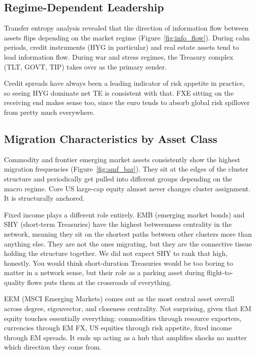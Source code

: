 \documentclass[12pt, letterpaper]{article}
\begin{document}
\subsection{Regime-Dependent Leadership}

Transfer entropy analysis revealed that the direction of information flow between assets flips depending on the market regime (Figure~\ref{fig:info_flow}). During calm periods, credit instruments (HYG in particular) and real estate assets tend to lead information flow. During war and stress regimes, the Treasury complex (TLT, GOVT, TIP) takes over as the primary sender.

Credit spreads have always been a leading indicator of risk appetite in practice, so seeing HYG dominate net TE is consistent with that. FXE sitting on the receiving end makes sense too, since the euro tends to absorb global risk spillover from pretty much everywhere.

\subsection{Migration Characteristics by Asset Class}

Commodity and frontier emerging market assets consistently show the highest migration frequencies (Figure~\ref{fig:amf_bar}). They sit at the edges of the cluster structure and periodically get pulled into different groups depending on the macro regime. Core US large-cap equity almost never changes cluster assignment. It is structurally anchored.

Fixed income plays a different role entirely. EMB (emerging market bonds) and SHY (short-term Treasuries) have the highest betweenness centrality in the network, meaning they sit on the shortest paths between other clusters more than anything else. They are not the ones migrating, but they are the connective tissue holding the structure together. We did not expect SHY to rank that high, honestly. You would think short-duration Treasuries would be too boring to matter in a network sense, but their role as a parking asset during flight-to-quality flows puts them at the crossroads of everything.

EEM (MSCI Emerging Markets) comes out as the most central asset overall across degree, eigenvector, and closeness centrality. Not surprising, given that EM equity touches essentially everything: commodities through resource exporters, currencies through EM FX, US equities through risk appetite, fixed income through EM spreads. It ends up acting as a hub that amplifies shocks no matter which direction they come from.
\end{document}
